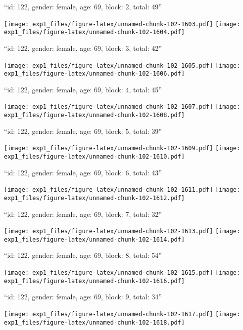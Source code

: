 \documentclass[11pt,,]{article}
\begin{document}
\newpage
[1] 

``id: 122, gender: female, age: 69, block: 2, total: 49''

\texttt{[image: exp1\_files/figure-latex/unnamed-chunk-102-1603.pdf]}
\texttt{[image: exp1\_files/figure-latex/unnamed-chunk-102-1604.pdf]}

\newpage
[1] 

``id: 122, gender: female, age: 69, block: 3, total: 42''

\texttt{[image: exp1\_files/figure-latex/unnamed-chunk-102-1605.pdf]}
\texttt{[image: exp1\_files/figure-latex/unnamed-chunk-102-1606.pdf]}

\newpage
[1] 

``id: 122, gender: female, age: 69, block: 4, total: 45''

\texttt{[image: exp1\_files/figure-latex/unnamed-chunk-102-1607.pdf]}
\texttt{[image: exp1\_files/figure-latex/unnamed-chunk-102-1608.pdf]}

\newpage
[1] 

``id: 122, gender: female, age: 69, block: 5, total: 39''

\texttt{[image: exp1\_files/figure-latex/unnamed-chunk-102-1609.pdf]}
\texttt{[image: exp1\_files/figure-latex/unnamed-chunk-102-1610.pdf]}

\newpage
[1] 

``id: 122, gender: female, age: 69, block: 6, total: 43''

\texttt{[image: exp1\_files/figure-latex/unnamed-chunk-102-1611.pdf]}
\texttt{[image: exp1\_files/figure-latex/unnamed-chunk-102-1612.pdf]}

\newpage
[1] 

``id: 122, gender: female, age: 69, block: 7, total: 32''

\texttt{[image: exp1\_files/figure-latex/unnamed-chunk-102-1613.pdf]}
\texttt{[image: exp1\_files/figure-latex/unnamed-chunk-102-1614.pdf]}

\newpage
[1] 

``id: 122, gender: female, age: 69, block: 8, total: 54''

\texttt{[image: exp1\_files/figure-latex/unnamed-chunk-102-1615.pdf]}
\texttt{[image: exp1\_files/figure-latex/unnamed-chunk-102-1616.pdf]}

\newpage
[1] 

``id: 122, gender: female, age: 69, block: 9, total: 34''

\texttt{[image: exp1\_files/figure-latex/unnamed-chunk-102-1617.pdf]}
\texttt{[image: exp1\_files/figure-latex/unnamed-chunk-102-1618.pdf]}
\end{document}
